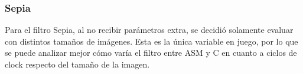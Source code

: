 \documentclass[a4paper]{article}
\begin{document}
\begin{centering}
\end{centering}

\newpage

\subsubsection{Sepia}
Para el filtro Sepia, al no recibir parámetros extra, se decidió solamente evaluar con distintos tamaños de imágenes.
Esta es la única variable en juego, por lo que se puede analizar mejor cómo varía el filtro entre ASM y C en cuanto a ciclos de clock
respecto del tamaño de la imagen.
\end{document}
